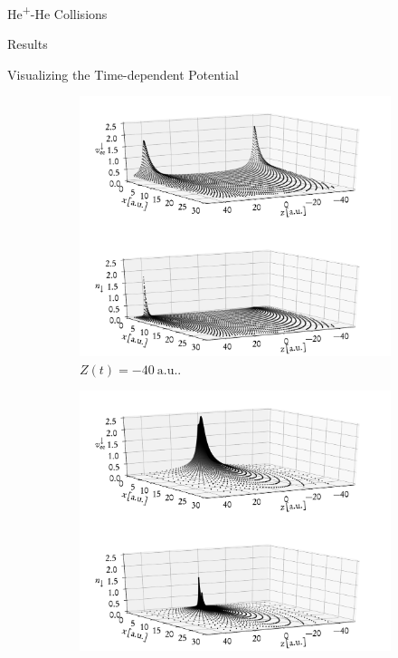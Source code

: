 \documentclass[letterpaper, 11 pt]{report}
\begin{document}
\begin{chapter}{\texorpdfstring{He\textsuperscript{+}}{He+}-He Collisions \label{chap:hephe}}
\begin{section}{Results \label{sec:hephe-disc}}
\begin{subsection}{Visualizing the Time-dependent Potential \label{sec:visual}}
         \begin{figure}[b]
            \centering
            \begin{subfigure}{.49\textwidth}
               \centering
               \includegraphics[width=\linewidth]{./images/frames/vee-dn-E50-b1-initial.pdf}
               \caption{$Z(t) = -40~\mathrm{a.u.}$. \label{fig:dnI}}
            \end{subfigure}
            \begin{subfigure}{.49\textwidth}
               \centering
               \includegraphics[width=\linewidth]{./images/frames/vee-dn-E50-b1-closest.pdf}

\end{subfigure}
\end{figure}
\end{subsection}
\end{section}
\end{chapter}
\end{document}

